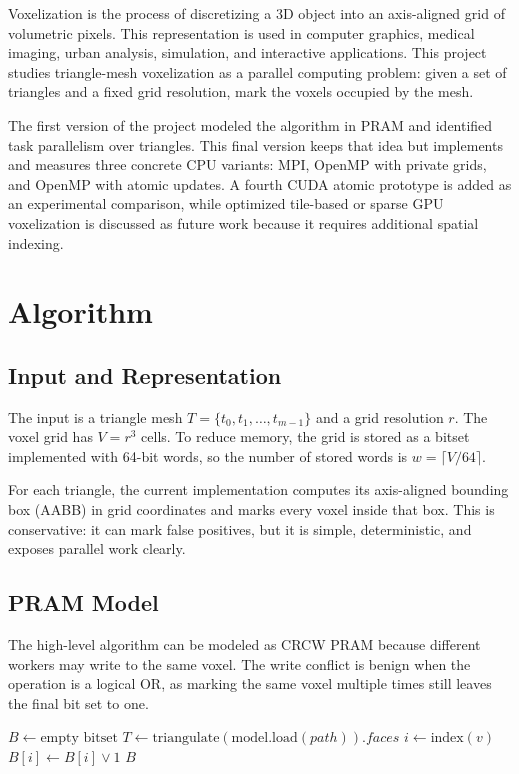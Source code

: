 \documentclass[conference]{IEEEtran}
\begin{document}
Voxelization is the process of discretizing a 3D object into an axis-aligned
grid of volumetric pixels. This representation is used in computer graphics,
medical imaging, urban analysis, simulation, and interactive applications. This
project studies triangle-mesh voxelization as a parallel computing problem:
given a set of triangles and a fixed grid resolution, mark the voxels occupied
by the mesh.

The first version of the project modeled the algorithm in PRAM and identified
task parallelism over triangles. This final version keeps that idea but
implements and measures three concrete CPU variants: MPI, OpenMP with private
grids, and OpenMP with atomic updates. A fourth CUDA atomic prototype is added
as an experimental comparison, while optimized tile-based or sparse GPU
voxelization is discussed as future work because it requires additional spatial
indexing.

\section{Algorithm}

\subsection{Input and Representation}

The input is a triangle mesh $T=\{t_0,t_1,\ldots,t_{m-1}\}$ and a grid
resolution $r$. The voxel grid has $V=r^3$ cells. To reduce memory, the grid is
stored as a bitset implemented with 64-bit words, so the number of stored words
is $w=\lceil V/64\rceil$.

For each triangle, the current implementation computes its axis-aligned
bounding box (AABB) in grid coordinates and marks every voxel inside that box.
This is conservative: it can mark false positives, but it is simple,
deterministic, and exposes parallel work clearly.

\subsection{PRAM Model}

The high-level algorithm can be modeled as CRCW PRAM because different workers
may write to the same voxel. The write conflict is benign when the operation is
a logical OR, as marking the same voxel multiple times still leaves the final
bit set to one.

\begin{algorithm}
  \caption{Voxelization (PRAM)}
  \begin{algorithmic}[1]
    \State$B \gets \text{empty bitset}$
    \State$T \gets \text{triangulate}(\text{model.load}(path)).faces$
    \State$i \gets \text{index}(v)$
    \State$B[i] \gets B[i] \lor 1$
    \EndFor{}
    \EndFor{}
    \State\Return$B$
  \end{algorithmic}
\end{algorithm}
\end{document}
